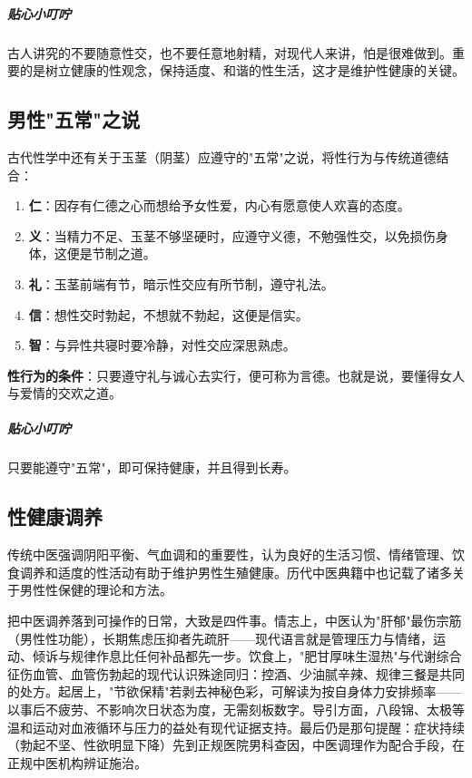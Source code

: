 \subparagraph{贴心小叮咛}

古人讲究的不要随意性交，也不要任意地射精，对现代人来讲，怕是很难做到。重要的是树立健康的性观念，保持适度、和谐的性生活，这才是维护性健康的关键。

\subsection{男性"五常"之说}

古代性学中还有关于玉茎（阴茎）应遵守的"五常"之说，将性行为与传统道德结合：

\begin{enumerate}
    \item \textbf{仁}：因存有仁德之心而想给予女性爱，内心有愿意使人欢喜的态度。
    \item \textbf{义}：当精力不足、玉茎不够坚硬时，应遵守义德，不勉强性交，以免损伤身体，这便是节制之道。
    \item \textbf{礼}：玉茎前端有节，暗示性交应有所节制，遵守礼法。
    \item \textbf{信}：想性交时勃起，不想就不勃起，这便是信实。
    \item \textbf{智}：与异性共寝时要冷静，对性交应深思熟虑。
\end{enumerate}

\textbf{性行为的条件}：只要遵守礼与诚心去实行，便可称为言德。也就是说，要懂得女人与爱情的交欢之道。

\subparagraph{贴心小叮咛}

只要能遵守"五常"，即可保持健康，并且得到长寿。

\subsection{性健康调养}

传统中医强调阴阳平衡、气血调和的重要性，认为良好的生活习惯、情绪管理、饮食调养和适度的性活动有助于维护男性生殖健康。历代中医典籍中也记载了诸多关于男性性保健的理论和方法。


把中医调养落到可操作的日常，大致是四件事。情志上，中医认为"肝郁"最伤宗筋（男性性功能），长期焦虑压抑者先疏肝——现代语言就是管理压力与情绪，运动、倾诉与规律作息比任何补品都先一步。饮食上，"肥甘厚味生湿热"与代谢综合征伤血管、血管伤勃起的现代认识殊途同归：控酒、少油腻辛辣、规律三餐是共同的处方。起居上，"节欲保精"若剥去神秘色彩，可解读为按自身体力安排频率——以事后不疲劳、不影响次日状态为度，无需刻板数字。导引方面，八段锦、太极等温和运动对血液循环与压力的益处有现代证据支持。最后仍是那句提醒：症状持续（勃起不坚、性欲明显下降）先到正规医院男科查因，中医调理作为配合手段，在正规中医机构辨证施治。

